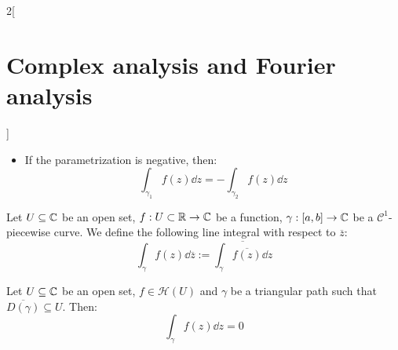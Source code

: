\documentclass[../../../main.tex]{subfiles}
\begin{document}
\begin{multicols}{2}[\section{Complex analysis and Fourier analysis}]
\begin{proposition}
\begin{itemize}
      \item If the parametrization is negative, then: $$\int_{\gamma_1}f(z)\dd{z}=-\int_{\gamma_2}f(z)\dd{z}$$
    \end{itemize}
  \end{proposition}
  \begin{definition}
    Let $U\subseteq \mathbb{C}$ be an open set, $f:U\subset\mathbb{R}\rightarrow\mathbb{C}$ be a function, $\gamma:[a,b]\rightarrow\mathbb{C}$ be a $\mathcal{C}^1$-piecewise curve. We define the following line integral with respect to $\overline{z}$: $$\int_{\gamma}f(z)\dd{\overline{z}}:=\overline{\int_{\gamma}\overline{f(z)}\dd{z}}$$
  \end{definition}
  \begin{theorem}
    Let $U\subseteq \mathbb{C}$ be an open set, $f\in\mathcal{H}(U)$ and $\gamma$ be a triangular path such that $\overline{D(\gamma)}\subseteq U$. Then: $$\int_\gamma f(z)\dd{z}=0$$
  \end{theorem}
\end{multicols}
\end{document}
